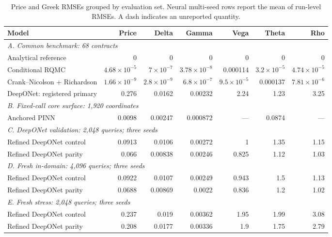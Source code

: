 \begin{table}[!ht]\centering\small\setlength{\tabcolsep}{3pt}
\caption{Price and Greek RMSEs grouped by evaluation set. Neural multi-seed rows report the mean of run-level RMSEs. A dash indicates an unreported quantity.}
\label{tab:master}
\begin{tabular}{lrrrrrr}\toprule
Model & Price & Delta & Gamma & Vega & Theta & Rho\\
\midrule\multicolumn{7}{l}{\textit{A. Common benchmark: 68 contracts}}\\
Analytical reference & 0 & 0 & 0 & 0 & 0 & 0\\
Conditional RQMC & $4.68\times10^{-5}$ & $7\times10^{-7}$ & $3.78\times10^{-8}$ & 0.000114 & $3.2\times10^{-5}$ & $4.74\times10^{-5}$\\
Crank--Nicolson + Richardson & $1.66\times10^{-9}$ & $2.8\times10^{-9}$ & $6.8\times10^{-7}$ & $9.5\times10^{-5}$ & 0.000137 & $7.81\times10^{-6}$\\
DeepONet: registered primary & 0.276 & 0.0162 & 0.00232 & 2.24 & 1.23 & 3.25\\
\midrule\multicolumn{7}{l}{\textit{B. Fixed-call core surface: 1,920 coordinates}}\\
Anchored PINN & 0.0098 & 0.00247 & 0.000872 & --- & 0.0874 & ---\\
\midrule\multicolumn{7}{l}{\textit{C. DeepONet validation: 2,048 queries; three seeds}}\\
Refined DeepONet control & 0.0913 & 0.0106 & 0.00272 & 1 & 1.35 & 1.15\\
Refined DeepONet parity & 0.066 & 0.00838 & 0.00246 & 0.825 & 1.12 & 1.03\\
\midrule\multicolumn{7}{l}{\textit{D. Fresh in-domain: 4,096 queries; three seeds}}\\
Refined DeepONet control & 0.0922 & 0.0107 & 0.00249 & 0.943 & 1.5 & 1.13\\
Refined DeepONet parity & 0.0688 & 0.00869 & 0.0022 & 0.836 & 1.2 & 1.02\\
\midrule\multicolumn{7}{l}{\textit{E. Fresh stress: 2,048 queries; three seeds}}\\
Refined DeepONet control & 0.237 & 0.019 & 0.00362 & 1.95 & 1.99 & 3.08\\
Refined DeepONet parity & 0.208 & 0.0177 & 0.00336 & 1.9 & 1.75 & 2.79\\
\bottomrule\end{tabular}\end{table}
